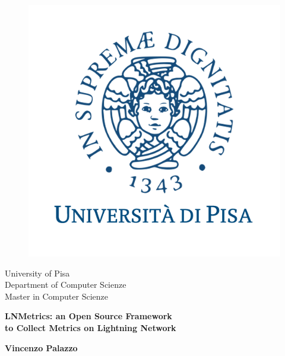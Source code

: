 \begin{titlepage}
\begin{figure}[!htb]
    \centering
    \includegraphics[keepaspectratio=true,scale=0.45]{format/img/unipi.png}
\end{figure}

\begin{center}
    \LARGE{University of Pisa}
    \vspace{5mm}
    \\ \large{Department of Computer Scienze}
    \vspace{5mm}
    \\ \LARGE{Master in Computer Scienze}
\end{center}

\vspace{3mm}
\begin{center}
    {\LARGE{\bf LNMetrics: an Open Source Framework\\ \vspace{5mm} to Collect Metrics on Lightning Network }}\\
\end{center}
\vspace{8mm}

\begin{center}
    {\bf \large{Vincenzo Palazzo}\\ {}}
\end{center}


\end{titlepage}
